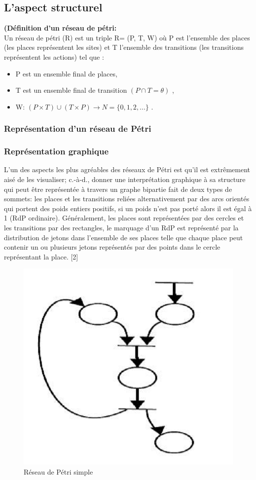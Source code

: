 \subsection{L'aspect structurel}
\begin{defn}\textbf{\textbf{(Définition d'un réseau de pétri:}}
	\\
Un réseau de pétri (R) est un triple R= (P, T, W) où P est l'ensemble des places (les places représentent les sites) et T l'ensemble des transitions (les transitions représentent les actions) tel que :
	
	\begin{itemize}
		\item  	P est un ensemble final de places,
		\item T est un ensemble final de transition $ (P \cap T = \theta ) $ ,
		\item W: $(P \times T) \cup (T \times P)\to N = \{0,1,2,...\} $  .
	\end{itemize}
	
\end{defn}

\subsubsection{Représentation d'un réseau de Pétri }


 
 \subsubsection*{Représentation graphique} 
  L'un des aspects les plus agréables des réseaux de Pétri est qu'il est extrêmement aisé de les visualiser; c.-à-d., donner une interprétation graphique à sa structure qui peut être représentée à travers un graphe bipartie fait de deux types de sommets: les places et les transitions reliées alternativement par des arcs orientés qui portent des poids entiers positifs, si un poids n'est pas porté alors il est égal à 1 (RdP ordinaire). Généralement, les places sont représentées par des cercles et les transitions par des rectangles, le marquage d'un RdP est représenté par la distribution de jetons dans l'ensemble de ses places telle que chaque place peut contenir un ou plusieurs jetons représentés par des points dans le cercle représentant la place. [2]
 
 
 
\begin{figure}[h]
	\centering
	\includegraphics[width=0.5\linewidth]{images/petrif01}
	\caption{ Réseau de Pétri simple }
	\label{fig:petrif01}
\end{figure}
